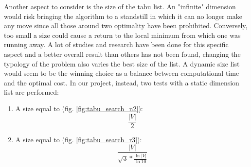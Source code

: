 Another aspect to consider is the size of the tabu list. An "infinite" dimension would risk bringing the algorithm to a standstill in which it can no longer make any move since all those around two optimality have been prohibited. Conversely, too small a size could cause a return to the local minimum from which one was running away. A lot of studies and research have been done for this specific aspect \cite{Nababan_2019, Tsubakitani1998} and a better overall result than others has not been found, changing the typology of the problem also varies the best size of the list. A dynamic size list would seem to be the winning choice as a balance between computational time and the optimal cost. In our project, instead, two tests with a static dimension list are performed:
\begin{enumerate}
\item A size equal to (fig. \ref{fig:tabu_search_n2}):
	\begin{equation}
		\frac{|V|}{2}
	\end{equation}
\item A size equal to (fig. \ref{fig:tabu_search_r3}):
	\begin{equation} \label{tabu_list_size_r3}
		\frac{|V|}{\sqrt{3} * \frac{\ln{|V|}}{\ln{10}}}
	\end{equation}
\end{enumerate}
